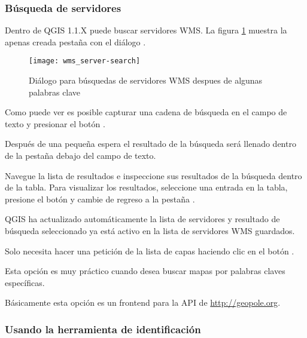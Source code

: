 % 
%
\subsubsection{Búsqueda de servidores}
\label{sec:serversearch}

Dentro de QGIS 1.1.X puede buscar servidores WMS. 
La figura \ref{fig:searchtab} muestra la apenas creada pestaña  con el diálogo .

\begin{figure}[ht]
  \begin{center}
  	\caption{Diálogo para búsquedas de servidores WMS despues de algunas palabras clave \nixcaption}\label{fig:searchtab}
	\texttt{[image: wms\_server-search]}
  \end{center}
\end{figure}

Como puede ver es posible capturar una cadena de búsqueda en el campo de texto y presionar el botón .

Después de una pequeña espera el resultado de la búsqueda será llenado dentro de la pestaña debajo del campo de texto.

Navegue la lista de resultados e inspeccione sus resultados de la búsqueda dentro de la tabla. Para visualizar los resultados, seleccione una entrada en la tabla, presione el botón  y cambie de regreso a la pestaña .

QGIS ha actualizado automáticamente la lista de servidores y resultado de búsqueda seleccionado ya está activo en la lista de servidores WMS guardados.

Solo necesita hacer una petición de la lista de capas haciendo clic en el botón .

Esta opción es muy práctico cuando desea buscar mapas por palabras claves específicas.

Básicamente esta opción es un frontend para la API de
\url{http://geopole.org}.

\subsubsection{Usando la herramienta de identificación}\label{sec:ogc-wms-identify}

